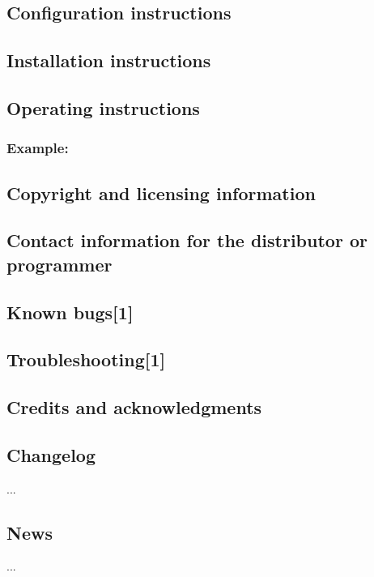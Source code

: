\subsection*{Configuration instructions}

\subsection*{Installation instructions}

\subsection*{Operating instructions}

\subsubsection*{Example\-:}

\subsection*{Copyright and licensing information}

\subsection*{Contact information for the distributor or programmer}

\subsection*{Known bugs\mbox{[}1\mbox{]}}

\subsection*{Troubleshooting\mbox{[}1\mbox{]}}

\subsection*{Credits and acknowledgments}

\subsection*{Changelog}

...

\subsection*{News}

... 